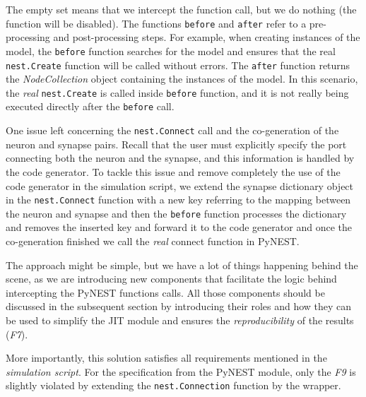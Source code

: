 The empty set means that we intercept the function call, but we do nothing (the function will be disabled). The functions \texttt{before} and \texttt{after} refer to a pre-processing and post-processing steps. For example, when creating instances of the model, the \texttt{before} function searches for the model and ensures that the real \texttt{nest.Create} function will be called without errors. The \texttt{after} function returns the \emph{NodeCollection} object containing the instances of the model. In this scenario, the \emph{real} \texttt{nest.Create} is called inside \texttt{before} function, and it is not really being executed directly after the \texttt{before} call. 

One issue left concerning the \texttt{nest.Connect} call and the co-generation of the neuron and synapse pairs. Recall that the user must explicitly specify the port connecting both the neuron and the synapse, and this information is handled by the code generator. To tackle this issue and remove completely the use of the code generator in the simulation script, we extend the synapse dictionary object in the \texttt{nest.Connect} function with a new key referring to the mapping between the neuron and synapse and then the \texttt{before} function processes the dictionary and removes the inserted key and forward it to the code generator and once the co-generation finished we call the \emph{real} connect function in PyNEST.


The approach might be simple, but we have a lot of things happening behind the scene, as we are introducing new components that facilitate the logic behind intercepting the PyNEST functions calls. All those components should be discussed in the subsequent section by introducing their roles and how they can be used to simplify the JIT module and ensures the \emph{reproducibility} of the results (\emph{F7}).


More importantly, this solution satisfies all requirements mentioned in the \emph{simulation script}. For the specification from the PyNEST module, only the \emph{F9} is slightly violated by extending the \texttt{nest.Connection} function by the wrapper.




